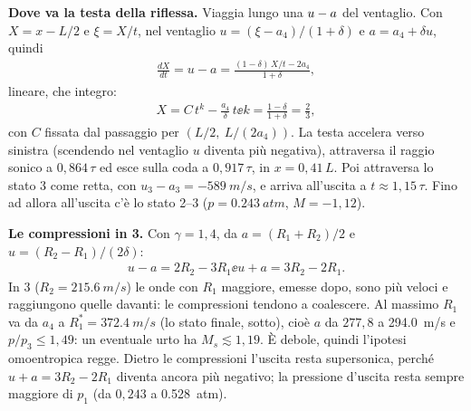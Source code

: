 \textbf{Dove va la testa della riflessa.} Viaggia lungo una $u-a$ del ventaglio. Con $X=x-L/2$ e $\xi=X/t$, nel ventaglio
$u=(\xi-a_4)/(1+\delta)$ e $a=a_4+\delta u$, quindi
\begin{gather*}
  \frac{dX}{dt}=u-a=\frac{(1-\delta)\,X/t-2a_4}{1+\delta},
\end{gather*}
lineare, che integro:
\begin{gather*}
  X=C\,t^{k}-\frac{a_4}{\delta}\,t \ee k=\frac{1-\delta}{1+\delta}=\frac23,
\end{gather*}
con $C$ fissata dal passaggio per $(L/2,\ L/(2a_4))$. La testa accelera verso sinistra (scendendo nel ventaglio $u$
diventa più negativa), attraversa il raggio sonico a $0{,}864\,\tau$ ed esce sulla coda a $0{,}917\,\tau$, in
$x=0{,}41\,L$. Poi attraversa lo stato 3 come retta, con $u_3-a_3=\SI{-589}{m/s}$, e arriva all'uscita a
$t\approx1{,}15\,\tau$. Fino ad allora all'uscita c'è lo stato 2--3 ($p=\SI{0.243}{atm}$, $M=-1{,}12$).

\textbf{Le compressioni in 3.} Con $\gamma=1{,}4$, da $a=(R_1+R_2)/2$ e $u=(R_2-R_1)/(2\delta)$:
\begin{gather*}
  u-a=2R_2-3R_1 \ee u+a=3R_2-2R_1 .
\end{gather*}
In 3 ($R_2=\SI{215.6}{m/s}$) le onde con $R_1$ maggiore, emesse dopo, sono più veloci e raggiungono quelle davanti: le
compressioni tendono a coalescere. Al massimo $R_1$ va da $a_4$ a $R_1^*=\SI{372.4}{m/s}$ (lo stato finale, sotto), cioè
$a$ da $277{,}8$ a \SI{294.0}{m/s} e $p/p_3\le1{,}49$: un eventuale urto ha $M_s\lesssim1{,}19$. È debole, quindi
l'ipotesi omoentropica regge. Dietro le compressioni l'uscita resta supersonica, perché $u+a=3R_2-2R_1$ diventa ancora
più negativo; la pressione d'uscita resta sempre maggiore di $p_1$ (da $0{,}243$ a \SI{0.528}{atm}).

